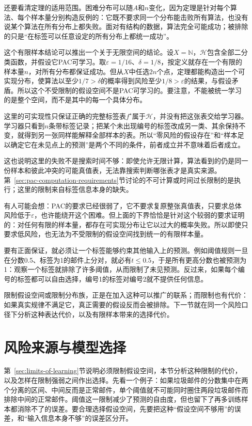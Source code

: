 还要看清定理的适用范围。困难分布可以随$A$和$n$变化，因为定理是针对每个算法、每个样本量分别构造反例的：它既不要求同一个分布能击败所有算法，也没有说某个算法在所有分布上都失败。面对有结构的数据，算法完全可能成功；被排除的只是“在标签可以任意设定的所有分布上都统一成功”。

这个有限样本结论可以推出一个关于无限空间的结论。设$X=\mathbb N$，$\mathcal H$包含全部二分类函数，并假设它PAC可学习。取$\varepsilon=1/16$、$\delta=1/8$，按定义就存在一个有限的样本量$n$，对所有分布都保证成功。但从$X$中任选$2n$个点，定理都能构造出一个可实现分布，使算法以至少$1/7>\delta$的概率得到风险至少$1/8>\varepsilon$的结果，与假设矛盾。所以这个不受限制的假设空间不是PAC可学习的。要注意，不能被统一学习的是整个空间，而不是其中的每一个具体分布。

这里的可实现性只保证正确的完整标签表$f^\star$属于$\mathcal H$，并没有把这张表交给学习器。学习器只看到$n$条带标签记录；把某个未出现编号的标签改成另一类、其余保持不变，就得到另一张同样能解释全部样本的表。所以“零风险的假设存在”和“样本足以确定它在未见点上的预测”是两个不同的条件，前者成立并不意味着后者成立。

这也说明这里的失败不是搜索时间不够：即使允许无限计算，算法看到的仍是同一份样本和彼此冲突的可能真值表，无法靠搜索判断哪张表才是真实来源。第~\ref{sec:pac-computation-requirements}节讨论的不可计算或时间过长限制的是执行；这里的限制来自标签信息本身的缺失。

有人可能会想：PAC的要求已经很弱了，它不要求复原整张真值表，只要求总体风险低于$\varepsilon$，也许能绕开这个困难。但上面的下界恰恰是针对这个较弱的要求证明的：对任何有限的样本量，都存在可实现分布让它以过大的概率失败。所以即使只要求低风险，也无法为不受限制的假设空间找到统一的有限样本量。

要有正面保证，就必须让一个标签能够约束其他输入上的预测。例如阈值规则一旦在分数0.5、标签为1的邮件上分对，就必有$t\leq0.5$，于是所有更高分数也被预测为1：观察一个标签就排除了许多阈值，从而限制了未见预测。反过来，如果每个编号的标签都可以自由选择，编号1的标签对编号2就不提供任何信息。

限制假设空间或限制分布族，正是在加入这种可以推广的联系；而限制也有代价：如果真实规律不满足它，真正需要的假设反而会被排除。下一节就在同一个风险口径下分析这种表达代价，以及有限样本带来的选择代价。

\section{风险来源与模型选择}
\label{sec:statistical-model-selection}

第~\ref{sec:limits-of-learning}节说明必须限制假设空间，本节分析这种限制的代价，以及怎样在限制强弱之间作出选择。先看一个例子：如果垃圾邮件的分数集中在两个分离的区间、中间反而是正常邮件，单个阈值就不可能同时圈住两段垃圾邮件而排除中间的正常邮件。阈值这一限制减少了预测的自由度，但也留下了再多训练样本都消除不了的误差。要合理选择假设空间，先要把这种“假设空间不够用”的误差，和“输入信息本身不够”的误差区分开。

